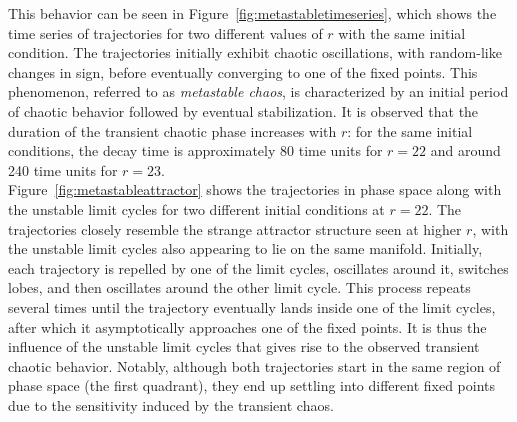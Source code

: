 \documentclass[paper=a4, fontsize=11pt]{scrartcl}
\numberwithin{equation}{section}		%
\numberwithin{figure}{section}			%
\numberwithin{table}{section}				%
\begin{document}
This behavior can be seen in Figure~\ref{fig:metastabletimeseries}, which shows the time series of trajectories for two different values of \( r \) with the same initial condition. The trajectories initially exhibit chaotic oscillations, with random-like changes in sign, before eventually converging to one of the fixed points. This phenomenon, referred to as \emph{metastable chaos}, is characterized by an initial period of chaotic behavior followed by eventual stabilization. It is observed that the duration of the transient chaotic phase increases with \( r \): for the same initial conditions, the decay time is approximately 80 time units for \( r = 22 \) and around 240 time units for \( r = 23 \).\\

Figure~\ref{fig:metastableattractor} shows the trajectories in phase space along with the unstable limit cycles for two different initial conditions at $r=22$. The trajectories closely resemble the strange attractor structure seen at higher $r$, with the unstable limit cycles also appearing to lie on the same manifold. Initially, each trajectory is repelled by one of the limit cycles, oscillates around it, switches lobes, and then oscillates around the other limit cycle. This process repeats several times until the trajectory eventually lands inside one of the limit cycles, after which it asymptotically approaches one of the fixed points. It is thus the influence of the unstable limit cycles that gives rise to the observed transient chaotic behavior. Notably, although both trajectories start in the same region of phase space (the first quadrant), they end up settling into different fixed points due to the sensitivity induced by the transient chaos.\\
\end{document}
